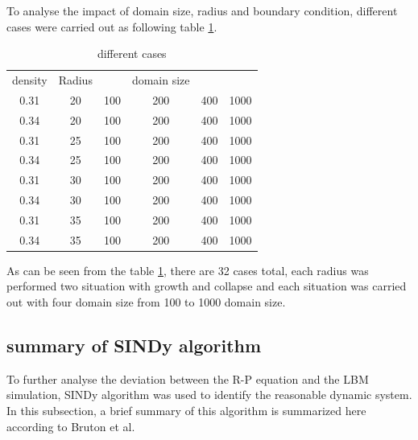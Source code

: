 \documentclass[review]{elsarticle}
\begin{document}
To analyse the impact of domain size, radius and boundary condition, different cases were carried out as following table \ref{tab:cases}.
\begin{table}[ht]
	\centering
	\caption{different cases}
	\label{tab:cases}
	\begin{tabular}{c c c c c c}
		& & \\ %
		\hline
		\hline
		density & Radius			&   	& domain size  				& 	& \\
		\hline
		0.31 &20			& 100  	& 200  				& 400	& 1000\\
		0.34 &20			& 100  	& 200  				& 400	& 1000\\
		0.31&		25			& 100  	& 200  				& 400	& 1000\\
		0.34&		25			& 100  	& 200  				& 400	& 1000\\
		0.31&30			& 100  	& 200  				& 400	& 1000\\
		0.34&30			& 100  	& 200  				& 400	& 1000\\
		0.31&35			& 100  	& 200  				& 400	& 1000\\
		0.34&35			& 100  	& 200  				& 400	& 1000\\
		\hline
		\hline
	\end{tabular}
\end{table}

As can be seen from the table \ref{tab:cases}, there are 32 cases total, each radius was performed two situation with growth and collapse and each situation was carried out with four domain size from 100 to 1000 domain size.    

\subsection{summary of SINDy algorithm}
To further analyse the deviation between the R-P equation and the LBM simulation, SINDy algorithm was used to identify the reasonable dynamic system. In this subsection, a brief summary of this algorithm is summarized here according to Bruton et al. \cite{brunton2017discovering}
\end{document}

